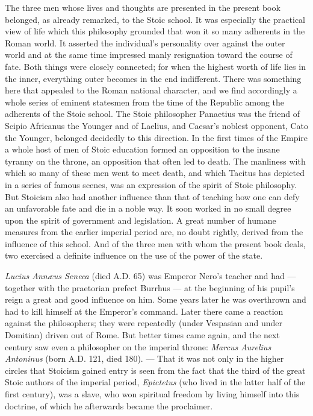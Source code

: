 \documentclass[12pt,a4paper,openany]{book}
\newcommand{\opage}[1]{\marginnote{\footnotesize\textit{[#1]}}}
\begin{document}
The three men whose lives and thoughts are presented in the
present book belonged, as already remarked, to the Stoic
school. It was especially the practical view of life which this philosophy
grounded that won it so many adherents
in the Roman world. It asserted the individual's
personality over against the outer world and at the same
time impressed manly resignation toward the course of fate. Both
things were closely connected; for when the highest worth of life lies
in the inner, everything outer becomes in the end indifferent. There was
something here that appealed to the Roman national character, and we
find accordingly a whole series of eminent statesmen from the
time of the Republic among the adherents of the Stoic school. The
Stoic philosopher Panaetius was the friend of Scipio Africanus the Younger
and of Laelius, and Caesar's noblest opponent, Cato the
Younger, belonged decidedly to this direction. In the first times of the Empire
a whole host of men of Stoic education formed an
opposition to the insane tyranny on the throne, an
opposition that often led to death. The manliness
with which so many of these men went to meet death, and which
Tacitus has depicted in a series of famous scenes, was an
expression of the spirit of Stoic philosophy. But Stoicism also had
another influence than that of teaching how one can
\opage{165}defy an unfavorable fate and die in a noble way. It soon
worked in no small degree upon the spirit of government and legislation.
A great number of humane measures from the earlier
imperial period are, no doubt rightly, derived from the influence of this school.
And of the three men with whom the present book deals,
two exercised a definite influence on the
use of the power of the state.

\emph{Lucius Annæus Seneca} (died A.D. 65) was Emperor Nero's
teacher and had --- together with the praetorian prefect Burrhus ---
at the beginning of his pupil's reign a great and good
influence on him. Some years later he was overthrown and
had to kill himself at the Emperor's command. Later there
came a reaction against the philosophers; they were repeatedly
(under Vespasian and under Domitian) driven out of Rome. But
better times came again, and the next century saw
even a philosopher on the imperial throne: \emph{Marcus Aurelius Antoninus}
(born A.D. 121, died 180). --- That it was not only in the
higher circles that Stoicism gained entry is seen from the fact that the
third of the great Stoic authors of the imperial period, \emph{Epictetus}
(who lived in the latter half of the first century), was
a slave, who won spiritual freedom by living himself into
this doctrine, of which he afterwards became the proclaimer.
\end{document}
